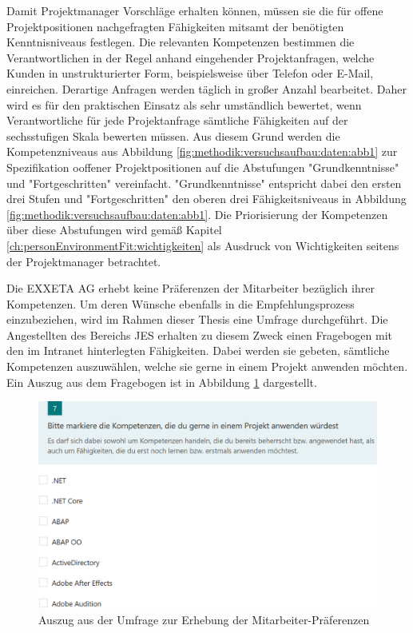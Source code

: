 Damit Projektmanager Vorschläge erhalten können, müssen sie die für offene Projektpositionen nachgefragten Fähigkeiten mitsamt der benötigten Kenntnisniveaus festlegen. Die relevanten Kompetenzen bestimmen die Verantwortlichen in der Regel anhand eingehender Projektanfragen, welche Kunden in unstrukturierter Form, beispielsweise über Telefon oder E-Mail, einreichen. Derartige Anfragen werden täglich in großer Anzahl bearbeitet. Daher wird es für den praktischen Einsatz als sehr umständlich bewertet, wenn Verantwortliche für jede Projektanfrage sämtliche Fähigkeiten auf der sechsstufigen Skala bewerten müssen. Aus diesem Grund werden die Kompetenzniveaus aus Abbildung \ref{fig:methodik:versuchsaufbau:daten:abb1} zur Spezifikation ooffener Projektpositionen auf die Abstufungen "Grundkenntnisse" und "Fortgeschritten" vereinfacht. "Grundkenntnisse" entspricht dabei den ersten drei Stufen und "Fortgeschritten" den oberen drei Fähigkeitsniveaus in Abbildung \ref{fig:methodik:versuchsaufbau:daten:abb1}. Die Priorisierung der Kompetenzen über diese Abstufungen wird gemäß Kapitel \ref{ch:personEnvironmentFit:wichtigkeiten} als Ausdruck von Wichtigkeiten seitens der Projektmanager betrachtet.

Die EXXETA AG erhebt keine Präferenzen der Mitarbeiter bezüglich ihrer Kompetenzen. Um deren Wünsche ebenfalls in die Empfehlungsprozess einzubeziehen, wird im Rahmen dieser Thesis eine Umfrage durchgeführt. Die Angestellten des Bereichs \acl{JES} erhalten zu diesem Zweck einen Fragebogen mit den \anzFaehigkeiten im Intranet hinterlegten Fähigkeiten. Dabei werden sie gebeten, sämtliche Kompetenzen auszuwählen, welche sie gerne in einem Projekt anwenden möchten. Ein Auszug aus dem Fragebogen ist in Abbildung \ref{fig:methodik:versuchsaufbau:abb1} dargestellt.

\begin{figure}[h]
	\centering
	\includegraphics[width=1\textwidth]{gfx/Umfage_Faehigkeiten.png}
	\caption{Auszug aus der Umfrage zur Erhebung der Mitarbeiter-Präferenzen}
	\label{fig:methodik:versuchsaufbau:abb1}
\end{figure}

